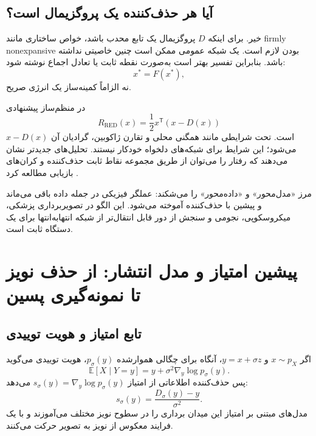 \documentclass[12pt,openany,oneside]{book}
\newcommand{\E}{\mathbb{E}}
\newcommand{\trans}{^{\mathsf T}}
\begin{document}
\subsection{آیا هر حذف‌کننده یک پروگزیمال است؟}
خیر. برای اینکه \(D\) پروگزیمال یک تابع محدب باشد، خواص ساختاری مانند firmly nonexpansive بودن لازم است.
یک شبکه عمومی ممکن است چنین خاصیتی نداشته باشد. بنابراین تفسیر  بهتر است به‌صورت نقطه ثابت یا تعادل اجماع نوشته شود:
\begin{equation}
x^*=F(x^*),
\end{equation}
نه الزاماً کمینه‌ساز یک انرژی صریح.

در  منظم‌ساز پیشنهادی
\begin{equation}
R_{\mathrm{RED}}(x)=\frac12x\trans(x-D(x))
\end{equation}
است. تحت شرایطی مانند همگنی محلی و تقارن ژاکوبین، گرادیان آن \(x-D(x)\) می‌شود؛ این شرایط برای شبکه‌های دلخواه خودکار نیستند.
تحلیل‌های جدیدتر نشان می‌دهند که رفتار  را می‌توان از طریق مجموعه نقاط ثابت حذف‌کننده و کران‌های بازیابی مطالعه کرد \cite{venkatakrishnan2013pnp,romano2017red,liu2021recovery}.

\begin{keybox}
 مرز «مدل‌محور» و «داده‌محور» را می‌شکند: عملگر فیزیکی در جمله داده باقی می‌ماند و پیشین با حذف‌کننده آموخته می‌شود.
این الگو در تصویربرداری پزشکی، میکروسکوپی، نجومی و سنجش از دور قابل انتقال‌تر از شبکه انتهابه‌انتها برای یک دستگاه ثابت است.
\end{keybox}

\section{پیشین امتیاز و مدل انتشار: از حذف نویز تا نمونه‌گیری پسین}

\subsection{تابع امتیاز و هویت توییدی}
اگر \(x\sim p_X\) و \(y=x+\sigma z\)، آنگاه برای چگالی هموارشده \(p_\sigma(y)\)، هویت توییدی می‌گوید
\begin{equation}
\E[X\mid Y=y]=y+\sigma^2\nabla_y\log p_\sigma(y).
\label{eq:tweedie}
\end{equation}
پس حذف‌کننده  اطلاعاتی از امتیاز \(s_\sigma(y)=\nabla_y\log p_\sigma(y)\) می‌دهد:
\begin{equation}
s_\sigma(y)=\frac{D_\sigma(y)-y}{\sigma^2}.
\end{equation}
مدل‌های مبتنی بر امتیاز این میدان برداری را در سطوح نویز مختلف می‌آموزند و با یک فرایند معکوس از نویز به تصویر حرکت می‌کنند.
\end{document}
